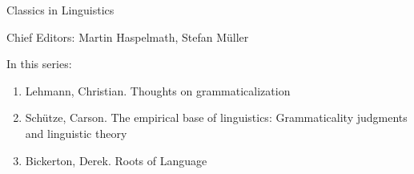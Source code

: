 {\large Classics in Linguistics}

\bigskip

Chief Editors: Martin Haspelmath, Stefan Müller

\bigskip

In this series:

\begin{enumerate}
\item Lehmann, Christian. Thoughts on grammaticalization
\item Schütze, Carson. The empirical base of linguistics: Grammaticality judgments and linguistic theory
\item Bickerton, Derek. Roots of Language
\end{enumerate}


\vfill



